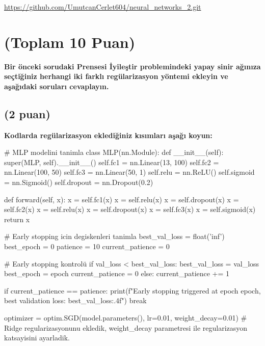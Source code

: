 \documentclass[11pt]{article}
\begin{document}
\url{https://github.com/UmutcanCerlet604/neural_networks_2.git}

\section{(Toplam 10 Puan)} \textbf{Bir önceki sorudaki Prensesi İyileştir problemindeki yapay sinir ağınıza seçtiğiniz herhangi iki farklı regülarizasyon yöntemi ekleyin ve aşağıdaki soruları cevaplayın.} 

\subsection{(2 puan)} \textbf{Kodlarda regülarizasyon eklediğiniz kısımları aşağı koyun:} 

\begin{python}
# MLP modelini tanimla
class MLP(nn.Module):
    def __init__(self):
        super(MLP, self).__init__()
        self.fc1 = nn.Linear(13, 100)
        self.fc2 = nn.Linear(100, 50)
        self.fc3 = nn.Linear(50, 1)
        self.relu = nn.ReLU()
        self.sigmoid = nn.Sigmoid()
        self.dropout = nn.Dropout(0.2)
        
    def forward(self, x):
        x = self.fc1(x)
        x = self.relu(x)
        x = self.dropout(x)
        x = self.fc2(x)
        x = self.relu(x)
        x = self.dropout(x)
        x = self.fc3(x)
        x = self.sigmoid(x)
        return x
\end{python}

\begin{python}
    # Early stopping icin degiskenleri tanimla
    best_val_loss = float('inf')
    best_epoch = 0
    patience = 10
    current_patience = 0

    # Early stopping kontrolü
        if val_loss < best_val_loss:
            best_val_loss = val_loss
            best_epoch = epoch
            current_patience = 0
        else:
            current_patience += 1
        
        if current_patience == patience:
            print(f"Early stopping triggered at epoch {epoch}, best validation loss: {best_val_loss:.4f}")
            break
\end{python}

\begin{python}
    optimizer = optim.SGD(model.parameters(), lr=0.01, weight_decay=0.01)
    # Ridge regularizasyonunu ekledik, weight_decay parametresi ile regularizasyon katsayisini ayarladik.
\end{python}
\end{document}
